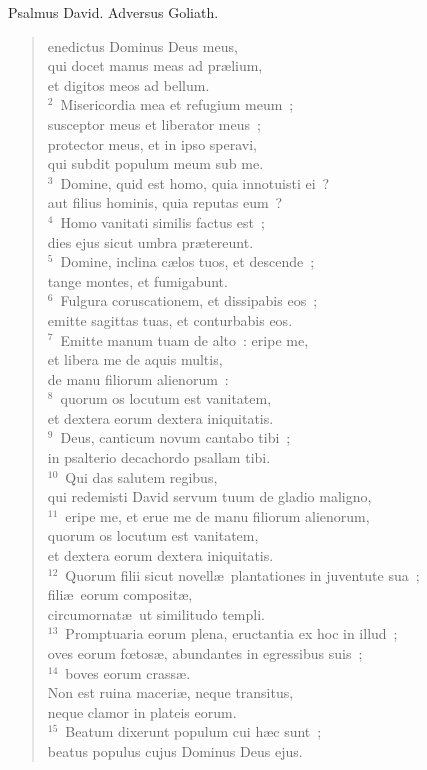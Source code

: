 \bchapter[Psalm]
Psalmus David. Adversus Goliath. \begin{verse}enedictus Dominus Deus meus,\\ qui docet manus meas ad pr\ae lium,\\ et digitos meos ad bellum.\\
${}^{2}$~Misericordia mea et refugium meum~;\\ susceptor meus et liberator meus~;\\ protector meus, et in ipso speravi,\\ qui subdit populum meum sub me.\\
${}^{3}$~Domine, quid est homo, quia innotuisti ei~?\\ aut filius hominis, quia reputas eum~?\\
${}^{4}$~Homo vanitati similis factus est~;\\ dies ejus sicut umbra pr\ae tereunt.\\
${}^{5}$~Domine, inclina c\ae los tuos, et descende~;\\ tange montes, et fumigabunt.\\
${}^{6}$~Fulgura coruscationem, et dissipabis eos~;\\ emitte sagittas tuas, et conturbabis eos.\\
${}^{7}$~Emitte manum tuam de alto~: eripe me,\\ et libera me de aquis multis,\\ de manu filiorum alienorum~:\\
${}^{8}$~quorum os locutum est vanitatem,\\ et dextera eorum dextera iniquitatis.\\
${}^{9}$~Deus, canticum novum cantabo tibi~;\\ in psalterio decachordo psallam tibi.\\
${}^{10}$~Qui das salutem regibus,\\ qui redemisti David servum tuum de gladio maligno,\\
${}^{11}$~eripe me, et erue me de manu filiorum alienorum,\\ quorum os locutum est vanitatem,\\ et dextera eorum dextera iniquitatis.\\
${}^{12}$~Quorum filii sicut novell\ae\ plantationes in juventute sua~;\\ fili\ae\ eorum composit\ae ,\\ circumornat\ae\ ut similitudo templi.\\
${}^{13}$~Promptuaria eorum plena, eructantia ex hoc in illud~;\\ oves eorum fœtos\ae , abundantes in egressibus suis~;\\
${}^{14}$~boves eorum crass\ae .\\ Non est ruina maceri\ae , neque transitus,\\ neque clamor in plateis eorum.\\
${}^{15}$~Beatum dixerunt populum cui h\ae c sunt~;\\ beatus populus cujus Dominus Deus ejus.\end{verse}



